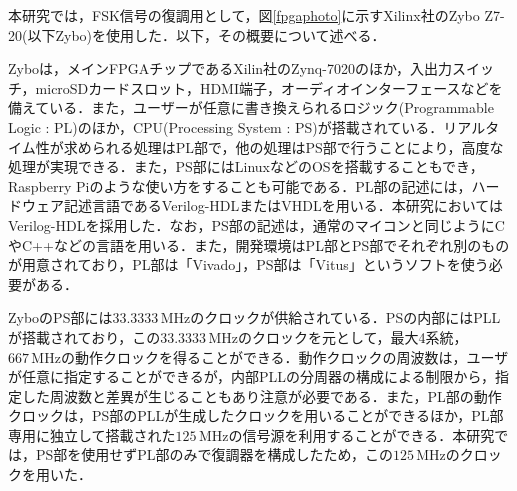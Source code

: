 本研究では，FSK信号の復調用として，図\ref{fpgaphoto}に示すXilinx社のZybo Z7-20(以下Zybo)を使用した．以下，その概要について述べる．\par 
Zyboは，メインFPGAチップであるXilin社のZynq-7020のほか，入出力スイッチ，microSDカードスロット，HDMI端子，オーディオインターフェースなどを備えている．また，ユーザーが任意に書き換えられるロジック(Programmable Logic : PL)のほか，CPU(Processing System : PS)が搭載されている．リアルタイム性が求められる処理はPL部で，他の処理はPS部で行うことにより，高度な処理が実現できる．また，PS部にはLinuxなどのOSを搭載することもでき，Raspberry Piのような使い方をすることも可能である．PL部の記述には，ハードウェア記述言語であるVerilog-HDL\cite{Kobayashi2018,Kimura2009,Kimura2001}またはVHDLを用いる．本研究においてはVerilog-HDLを採用した．なお，PS部の記述は，通常のマイコンと同じようにCやC++などの言語を用いる．また，開発環境はPL部とPS部でそれぞれ別のものが用意されており，PL部は「Vivado」，PS部は「Vitus」というソフトを使う必要がある．\par
ZyboのPS部には$33.3333 \, \mathrm{MHz}$のクロックが供給されている\cite{zybo}．PSの内部にはPLLが搭載されており，この$33.3333 \, \mathrm{MHz}$のクロックを元として，最大4系統，$667\, \mathrm{MHz}$の動作クロックを得ることができる．動作クロックの周波数は，ユーザが任意に指定することができるが，内部PLLの分周器の構成による制限から，指定した周波数と差異が生じることもあり注意が必要である．また，PL部の動作クロックは，PS部のPLLが生成したクロックを用いることができるほか，PL部専用に独立して搭載された$125 \, \mathrm{MHz}$の信号源を利用することができる．本研究では，PS部を使用せずPL部のみで復調器を構成したため，この$125 \, \mathrm{MHz}$のクロックを用いた．\par 

